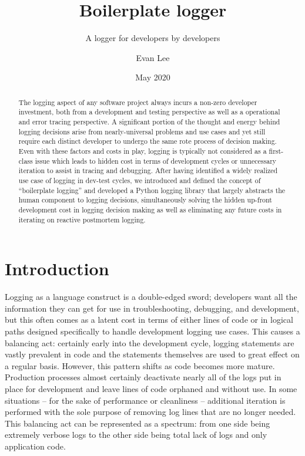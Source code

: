 \documentclass[acmsmall,review,authorversion]{acmart}
\title{Boilerplate logger}
\subtitle{A logger for developers by developers}
\author{Evan Lee}
\affiliation{%
    \institution{University of Colorado Boulder}
    \city{Boulder}
    \state{Colorado}
}
\date{May 2020}
\begin{document}
\begin{abstract}
    The logging aspect of any software project always incurs a non-zero developer investment, both from a development and testing perspective as well as a operational and error tracing perspective. A significant portion of the thought and energy behind logging decisions arise from nearly-universal problems and use cases and yet still require each distinct developer to undergo the same rote process of decision making. Even with these factors and costs in play, logging is typically not considered as a first-class issue which leads to hidden cost in terms of development cycles or unnecessary iteration to assist in tracing and debugging. After having identified a widely realized use case of logging in dev-test cycles, we introduced and defined the concept of ``boilerplate logging'' and developed a Python logging library that largely abstracts the human component to logging decisions, simultaneously solving the hidden up-front development cost in logging decision making as well as eliminating any future costs in iterating on reactive postmortem logging.
\end{abstract}

\maketitle

\section{Introduction}

    Logging as a language construct is a double-edged sword; developers want all the information they can get for use in troubleshooting, debugging, and development, but this often comes as a latent cost in terms of either lines of code or in logical paths designed specifically to handle development logging use cases. This causes a balancing act: certainly early into the development cycle, logging statements are vastly prevalent in code and the statements themselves are used to great effect on a regular basis. However, this pattern shifts as code becomes more mature. Production processes almost certainly deactivate nearly all of the logs put in place for development and leave lines of code orphaned and without use. In some situations -- for the sake of performance or cleanliness -- additional iteration is performed with the sole purpose of removing log lines that are no longer needed. This balancing act can be represented as a spectrum: from one side being extremely verbose logs to the other side being total lack of logs and only application code.
\end{document}
